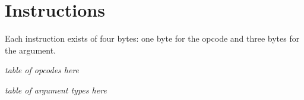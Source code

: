 \section{Instructions}

Each instruction exists of four bytes: one byte for the opcode and three bytes
for the argument.

\emph{table of opcodes here}

\emph{table of argument types here}
